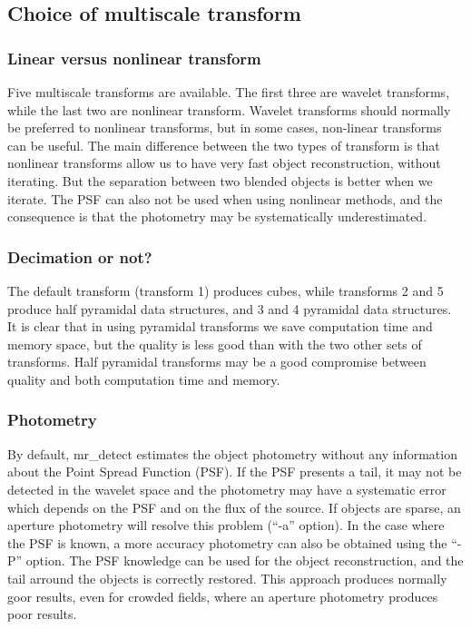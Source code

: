 \subsection{Choice of multiscale transform}
\subsubsection*{Linear versus nonlinear transform}
Five multiscale transforms are available. The first three are wavelet 
transforms, while the last two are nonlinear transform. Wavelet transforms
should normally be preferred to nonlinear transforms, but in some cases, 
non-linear transforms can be useful. The main difference between the two
types of transform  is that nonlinear transforms allow us to have very
fast object reconstruction, without iterating. But the separation between
two blended objects is better when we iterate. 
The PSF can also not be used when
using nonlinear methods, and the consequence is that the photometry may 
be systematically underestimated. 

\subsubsection*{Decimation or not?}
The default transform (transform 1) produces cubes, while transforms 
2 and 5 produce half pyramidal data structures, and 3 and 4 pyramidal 
data structures. It is clear that in using pyramidal transforms we save
computation time and memory space, but the quality is less good than with
the two other sets of transforms. Half pyramidal transforms may be
a good compromise between quality and both computation time and memory.

\subsubsection*{Photometry}
By default, {mr\_detect} estimates the object photometry without any
information about the Point Spread Function (PSF). If the PSF presents
a tail, it may not be detected in the wavelet space and the photometry
may have a systematic error which depends on the PSF and 
on the flux of the source. If objects are sparse, an aperture photometry
will resolve this problem (``-a'' option). In the case
where the PSF is known, a more accuracy photometry 
can also be obtained using the ``-P'' option. The PSF knowledge can be used
for the object reconstruction, and the tail arround the objects is correctly
restored. This approach produces normally goor results, even for crowded
fields, where an aperture photometry produces poor results.

